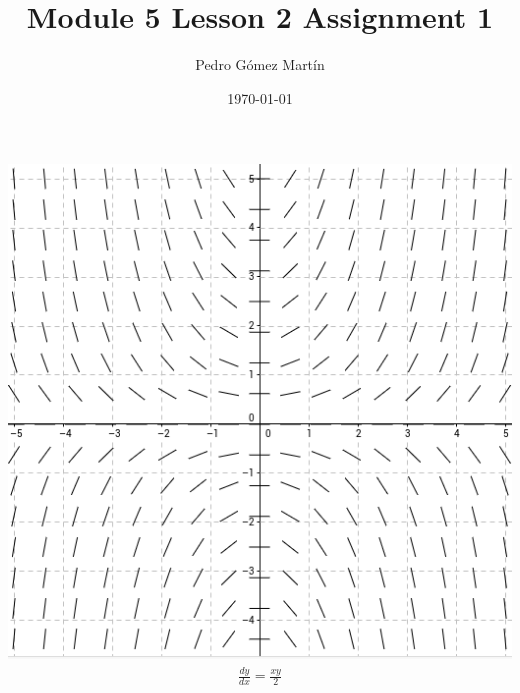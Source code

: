 \documentclass{article}
\author{Pedro G\'{o}mez Mart\'{i}n}
\date{\today}
\title{Module 5 Lesson 2 Assignment 1}
\begin{document}
\maketitle
\includegraphics[width=\textwidth]{Slope_Field}\\
\begin{align*}
  \frac{dy}{dx}=\frac{xy}{2}
\end{align*}
	
\end{document}
